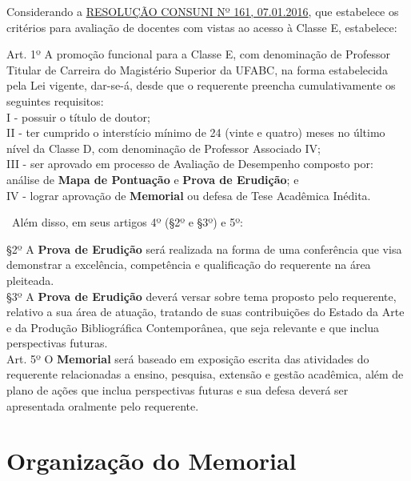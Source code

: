 Considerando a \href{https://www.ufabc.edu.br/images/consuni/resolucoes/resolucao_consuni_161_-_dispoe_sobre_o_estabelecimento_aplicacao_de_criterios_para_avaliacao_de_docentes_para_professor_titular_de_carreira.pdf}{RESOLUÇÃO CONSUNI Nº 161, 07.01.2016}, que estabelece os critérios para avaliação de docentes com vistas ao acesso à Classe E, estabelece:
\
\begin{quoting}[rightmargin=0cm,leftmargin=2cm]
{\footnotesize 
Art. 1º A promoção funcional para a Classe E, com denominação de Professor Titular de Carreira do Magistério Superior da UFABC, na forma estabelecida pela Lei vigente, dar-se-á, desde que o requerente preencha cumulativamente os seguintes requisitos:\\
I - possuir o título de doutor;\\
II - ter cumprido o interstício mínimo de 24 (vinte e quatro) meses no último nível da Classe D, com denominação de Professor Associado IV;\\
III - ser aprovado em processo de Avaliação de Desempenho composto por: análise de \textbf{Mapa de Pontuação} e \textbf{Prova de Erudição}; e\\
IV - lograr aprovação de \textbf{Memorial} ou defesa de Tese Acadêmica Inédita.
}
\end{quoting}
\
Além disso, em seus artigos 4º (§2º e §3º) e 5º:
\
\begin{quoting}[rightmargin=0cm,leftmargin=2cm]
{\footnotesize 
§2º A \textbf{Prova de Erudição} será realizada na forma de uma conferência que visa demonstrar a excelência, competência e qualificação do requerente na área pleiteada.\\
§3º A \textbf{Prova de Erudição} deverá versar sobre tema proposto pelo requerente, relativo a sua área de atuação, tratando de suas contribuições do Estado da Arte e da Produção Bibliográfica Contemporânea, que seja relevante e que inclua perspectivas futuras.\\
Art. 5º O \textbf{Memorial} será baseado em exposição escrita das atividades do requerente relacionadas a ensino, pesquisa, extensão e gestão acadêmica, além de plano de ações que inclua perspectivas futuras e sua defesa deverá ser apresentada oralmente pelo requerente.
}
\end{quoting}




\section{Organização do Memorial}

